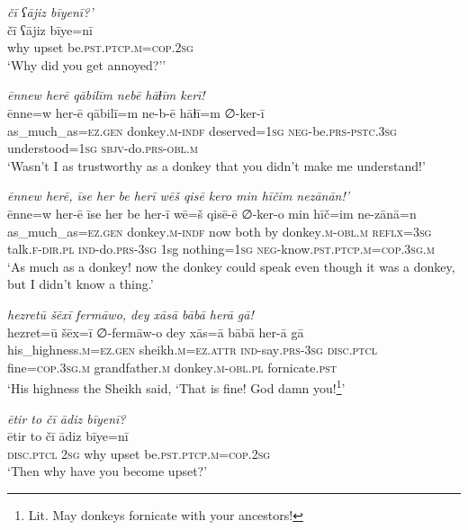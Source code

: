 \ea \label{HB.81}
\textit{čī ʕājiz bīyenī?’} \\ 
\gll čī ʕājiz bīye=nī \\ 
 why upset be\textsc{.pst}\textsc{.ptcp}\textsc{.m}\textsc{=cop}\textsc{.\textsc{2sg}} \\ 
\glt `Why did you get annoyed?’'
\z 
 
\ea \label{HB.83}
\textit{ēnnew herē qābilīm nebē hāɫīm kerī!} \\ 
\gll ēnne=w her-ē qābilī=m ne-b-ē hāɫī=m ∅-ker-ī \\ 
 as\_much\_as\textsc{=ez}\textsc{.gen} donkey\textsc{.m}\textsc{-indf} deserved\textsc{=1sg} \textsc{neg-}be\textsc{.prs}\textsc{-pstc}\textsc{.3sg} understood\textsc{=1sg} \textsc{sbjv-}do\textsc{.prs}\textsc{-obl}\textsc{.m} \\ 
\glt `Wasn’t I as trustworthy as a donkey that you didn’t make me understand!'
\z 
 
\ea \label{HB.84}
\textit{ēnnew herē, īse her be herī wēš qisē kero min hīčim nezānān!’} \\ 
\gll ēnne=w her-ē īse her be her-ī wē=š qisē-ē ∅-ker-o min hīč=im ne-zānā=n \\ 
 as\_much\_as\textsc{=ez}\textsc{.gen} donkey\textsc{.m}\textsc{-indf} now both by donkey\textsc{.m}\textsc{-obl}\textsc{.m} \textsc{reflx}\textsc{=3sg} talk\textsc{\textsc{.f}}\textsc{-dir}\textsc{.pl} \textsc{ind-}do\textsc{.prs}\textsc{-3sg} 1sg nothing\textsc{=1sg} \textsc{neg-}know\textsc{.pst}\textsc{.ptcp}\textsc{.m}\textsc{=cop}\textsc{.3sg}\textsc{.m} \\ 
\glt `As much as a donkey! now the donkey could speak even though it was a donkey, but I didn’t know a thing.'
\z 
 
\ea \label{HB.85}
\textit{hezretū šēxī fermāwo, dey xāsā bābā herā gā!} \\ 
\gll hezret=ū šēx=ī ∅-fermāw-o dey xās=ā bābā her-ā gā \\ 
 his\_highness\textsc{.m}\textsc{=ez}\textsc{.gen} sheikh\textsc{.m}\textsc{=ez}.\textsc{attr} \textsc{ind-}say\textsc{.prs}\textsc{-3sg} \textsc{disc.ptcl} fine\textsc{=cop}\textsc{.3sg}\textsc{.m} grandfather\textsc{.m} donkey\textsc{.m}\textsc{-obl}\textsc{.pl} fornicate\textsc{.pst} \\ 
\glt `His highness the Sheikh said, ‘That is fine! God damn you!\footnote{Lit. May donkeys fornicate with your ancestors!}'
\z 
 
\ea \label{HB.89}
\textit{ētir to čī ādiz bīyenī?} \\ 
\gll ētir to čī ādiz bīye=nī \\ 
 \textsc{disc.ptcl} \textsc{2sg} why upset be\textsc{.pst}\textsc{.ptcp}\textsc{.m}\textsc{=cop}\textsc{.\textsc{2sg}} \\ 
\glt `Then why have you become upset?'
\z 
 
